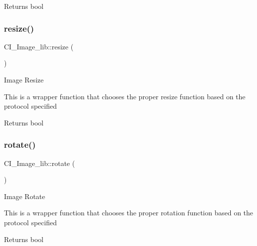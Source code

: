 \begin{DoxyReturn}{Returns}
bool 
\end{DoxyReturn}
\mbox{\label{class_c_i___image__lib_a661e23a05684c47d1bcdadd088905dbe}} 
\subsubsection{\texorpdfstring{resize()}{resize()}}
{\footnotesize\ttfamily C\+I\+\_\+\+Image\+\_\+lib\+::resize (\begin{DoxyParamCaption}{ }\end{DoxyParamCaption})}

Image Resize

This is a wrapper function that chooses the proper resize function based on the protocol specified

\begin{DoxyReturn}{Returns}
bool 
\end{DoxyReturn}
\mbox{\label{class_c_i___image__lib_ac5aa66e135ea2b3ff9c35af5b45251a6}} 
\subsubsection{\texorpdfstring{rotate()}{rotate()}}
{\footnotesize\ttfamily C\+I\+\_\+\+Image\+\_\+lib\+::rotate (\begin{DoxyParamCaption}{ }\end{DoxyParamCaption})}

Image Rotate

This is a wrapper function that chooses the proper rotation function based on the protocol specified

\begin{DoxyReturn}{Returns}
bool 
\end{DoxyReturn}
\mbox{\label{class_c_i___image__lib_aeecd7806232bb97f8c94184f633e93c0}} 
